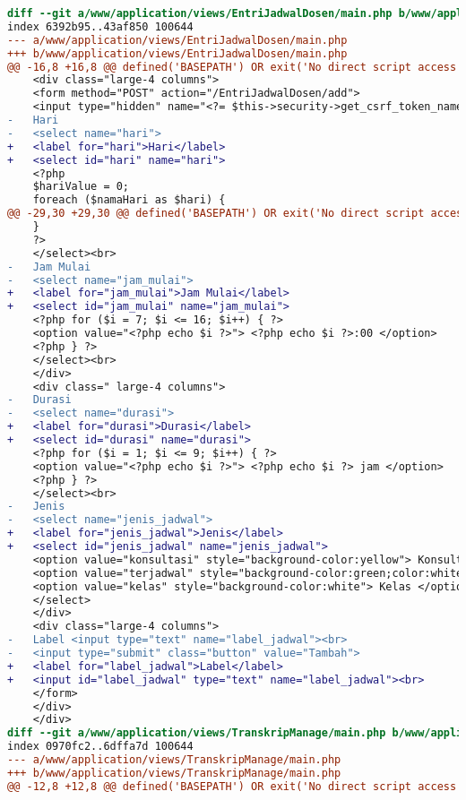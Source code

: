 \begin{lstlisting}[frame=single, label={lst:perbaikan_3.3.2_label_masukan}, language=diff, caption=Perbaikan Kriteria Sukses 3.3.2 - Tidak Terdapat Label pada Kolom Masukan]
diff --git a/www/application/views/EntriJadwalDosen/main.php b/www/application/views/EntriJadwalDosen/main.php
index 6392b95..43af850 100644
--- a/www/application/views/EntriJadwalDosen/main.php
+++ b/www/application/views/EntriJadwalDosen/main.php
@@ -16,8 +16,8 @@ defined('BASEPATH') OR exit('No direct script access allowed');
    <div class="large-4 columns">
    <form method="POST" action="/EntriJadwalDosen/add">
    <input type="hidden" name="<?= $this->security->get_csrf_token_name() ?>" value="<?= $this->security->get_csrf_hash() ?>" />
-   Hari
-   <select name="hari"> 
+   <label for="hari">Hari</label>
+   <select id="hari" name="hari"> 
    <?php
    $hariValue = 0;
    foreach ($namaHari as $hari) {
@@ -29,30 +29,30 @@ defined('BASEPATH') OR exit('No direct script access allowed');
    }
    ?>
    </select><br>
-   Jam Mulai
-   <select name="jam_mulai"> 
+   <label for="jam_mulai">Jam Mulai</label>
+   <select id="jam_mulai" name="jam_mulai">  
    <?php for ($i = 7; $i <= 16; $i++) { ?>
    <option value="<?php echo $i ?>"> <?php echo $i ?>:00 </option>
    <?php } ?>
    </select><br>
    </div>
    <div class=" large-4 columns">
-   Durasi
-   <select name="durasi"> 
+   <label for="durasi">Durasi</label>
+   <select id="durasi" name="durasi">  
    <?php for ($i = 1; $i <= 9; $i++) { ?>
    <option value="<?php echo $i ?>"> <?php echo $i ?> jam </option>
    <?php } ?>
    </select><br>
-   Jenis  
-   <select name="jenis_jadwal"> 
+   <label for="jenis_jadwal">Jenis</label>
+   <select id="jenis_jadwal" name="jenis_jadwal">  
    <option value="konsultasi" style="background-color:yellow"> Konsultasi </option>
    <option value="terjadwal" style="background-color:green;color:white"> Terjadwal</option>
    <option value="kelas" style="background-color:white"> Kelas </option>
    </select>
    </div>
    <div class="large-4 columns">
-   Label <input type="text" name="label_jadwal"><br>
-   <input type="submit" class="button" value="Tambah">
+   <label for="label_jadwal">Label</label>
+   <input id="label_jadwal" type="text" name="label_jadwal"><br>
    </form>
    </div>
    </div>
diff --git a/www/application/views/TranskripManage/main.php b/www/application/views/TranskripManage/main.php
index 0970fc2..6dffa7d 100644
--- a/www/application/views/TranskripManage/main.php
+++ b/www/application/views/TranskripManage/main.php
@@ -12,8 +12,8 @@ defined('BASEPATH') OR exit('No direct script access allowed');

\end{lstlisting}
